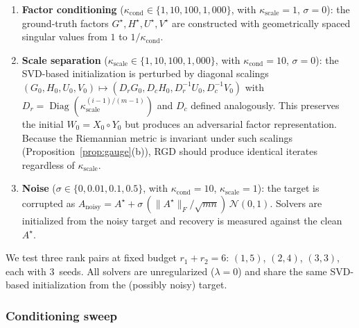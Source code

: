 \documentclass[letterpaper, 10 pt, conference]{ieeeconf}
\newcommand{\diag}{\operatorname{Diag}}
\newcommand{\Had}{\circ}
\theoremstyle{plain}
\theoremstyle{definition}
\theoremstyle{remark}
\begin{document}
\begin{enumerate}[nosep]
\item \textbf{Factor conditioning} ($\kappa_{\mathrm{cond}} \in \{1,10,100,1{,}000\}$, with $\kappa_{\mathrm{scale}}{=}1$, $\sigma{=}0$):
the ground-truth factors $G^\star, H^\star, U^\star, V^\star$ are constructed with geometrically spaced singular values from $1$ to $1/\kappa_{\mathrm{cond}}$.
\item \textbf{Scale separation} ($\kappa_{\mathrm{scale}} \in \{1,10,100,1{,}000\}$, with $\kappa_{\mathrm{cond}}{=}10$, $\sigma{=}0$):
the SVD-based initialization is perturbed by diagonal scalings
$(G_0,H_0,U_0,V_0) \mapsto (D_r G_0, D_c H_0, D_r^{-1} U_0, D_c^{-1} V_0)$
with $D_r = \diag(\kappa_{\mathrm{scale}}^{(i{-}1)/(m{-}1)})$ and $D_c$ defined analogously.
This preserves the initial $W_0 = X_0 \Had Y_0$ but produces an adversarial factor representation.
Because the Riemannian metric is invariant under such scalings (Proposition~\ref{prop:gauge}(b)), RGD should produce identical iterates regardless of $\kappa_{\mathrm{scale}}$.
\item \textbf{Noise} ($\sigma \in \{0,0.01,0.1,0.5\}$, with $\kappa_{\mathrm{cond}}{=}10$, $\kappa_{\mathrm{scale}}{=}1$):
the target is corrupted as $A_{\mathrm{noisy}} = A^\star + \sigma\,(\|A^\star\|_F / \sqrt{mn})\,\mathcal{N}(0,1)$. Solvers are initialized from the noisy target and recovery is measured against the clean $A^\star$.
\end{enumerate}
We test three rank pairs at fixed budget $r_1{+}r_2{=}6$: $(1,5)$, $(2,4)$, $(3,3)$, each with 3~seeds.
All solvers are unregularized ($\lambda{=}0$) and share the same SVD-based initialization from the (possibly noisy) target.

\subsubsection{Conditioning sweep}
\end{document}
